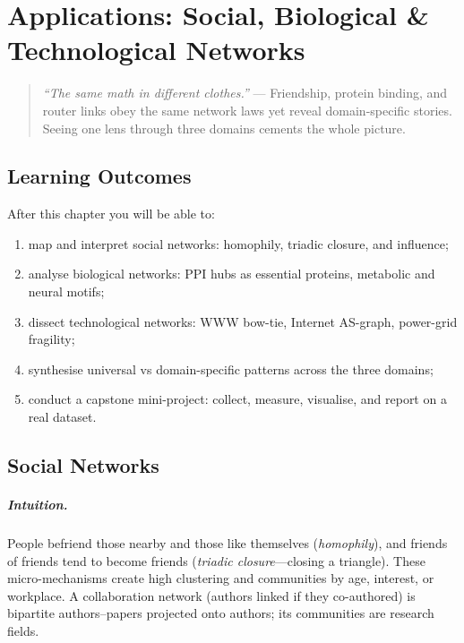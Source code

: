 \chapter{Applications: Social, Biological \& Technological Networks}
\label{ch:applications}
\sloppy

\begin{quote}
\emph{``The same math in different clothes.''} --- Friendship, protein binding, and router links obey the same network laws yet reveal domain-specific stories. Seeing one lens through three domains cements the whole picture.
\end{quote}

\noindent{}
\vspace{0.4em}

\section*{Learning Outcomes}
After this chapter you will be able to:
\begin{enumerate}[label=(L\arabic*)]
    \item map and interpret social networks: homophily, triadic closure, and influence;
    \item analyse biological networks: PPI hubs as essential proteins, metabolic and neural motifs;
    \item dissect technological networks: WWW bow-tie, Internet AS-graph, power-grid fragility;
    \item synthesise universal vs domain-specific patterns across the three domains;
    \item conduct a capstone mini-project: collect, measure, visualise, and report on a real dataset.
\end{enumerate}

\section{Social Networks}
\label{sec:social}
\paragraph{Intuition.} People befriend those nearby and those like themselves (\emph{homophily}), and friends of friends tend to become friends (\emph{triadic closure}---closing a triangle). These micro-mechanisms create high clustering and communities by age, interest, or workplace. A collaboration network (authors linked if they co-authored) is bipartite authors--papers projected onto authors; its communities are research fields.

